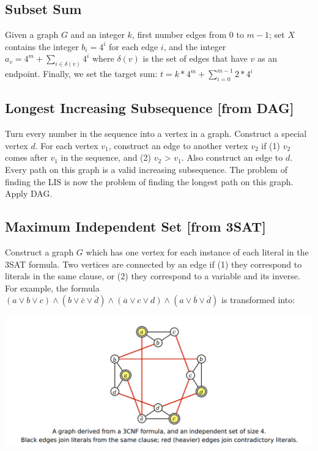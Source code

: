 \subsection{Subset Sum}

Given a graph $G$ and an integer $k$, first number edges from 0 to $m-1$; set $X$ contains the integer $b_{i} = 4^{i}$ for each edge $i$, and the integer $a_{v} = 4^{m} + \sum_{i \in \delta(v)}{4^i}$ where $\delta(v)$ is the set of edges that have $v$ as an endpoint. Finally, we set the target sum: $t = k * 4^m + \sum_{i = 0}^{m-1}{2 * 4^i}$

\subsection{Longest Increasing Subsequence [from DAG]}

Turn every number in the sequence into a vertex in a graph. Construct a special vertex $d$. For each vertex $v_1$, construct an edge to another vertex $v_2$ if (1) $v_2$ comes after $v_1$ in the sequence, and (2) $v_2$ > $v_1$. Also construct an edge to $d$.\\ 

Every path on this graph is a valid increasing subsequence. The problem of finding the LIS is now the problem of finding the longest path on this graph. Apply DAG.

\subsection{Maximum Independent Set [from 3SAT]}

Construct a graph $G$ which has one vertex for each instance of each literal in the 3SAT formula. Two vertices are connected by an edge if (1) they correspond to literals in the same clause, or (2) they correspond to a variable and its inverse. For example, the formula $(a \vee b \vee c) \wedge (b \vee \overline{c} \vee \overline{d}) \wedge (\overline{a} \vee c \vee d) \wedge (a \vee \overline{b} \vee \overline{d})$ is transformed into:

\includegraphics[width=\linewidth]{images/3CNFGraph.png}

